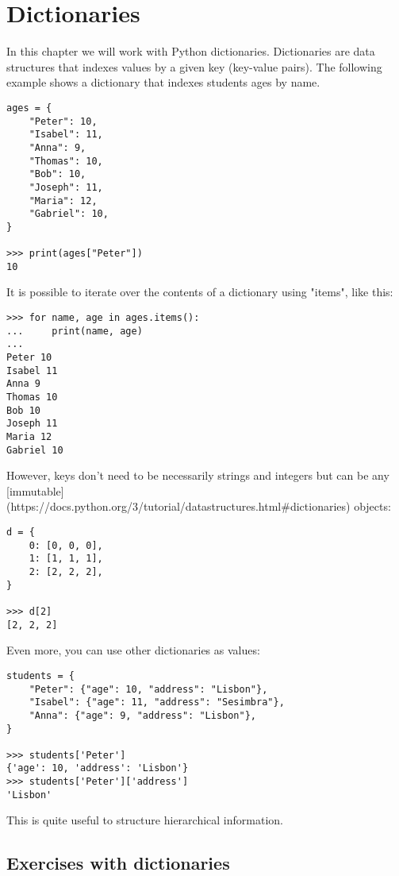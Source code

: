\chapter{Dictionaries}\label{dictionaries}

In this chapter we will work with Python dictionaries. Dictionaries are data structures that indexes values by a given key (key-value pairs). The following example shows a dictionary that indexes students ages by name.

\begin{lstlisting}
ages = {
    "Peter": 10,
    "Isabel": 11,
    "Anna": 9,
    "Thomas": 10,
    "Bob": 10,
    "Joseph": 11,
    "Maria": 12,
    "Gabriel": 10,
}

>>> print(ages["Peter"])
10
\end{lstlisting}

It is possible to iterate over the contents of a dictionary using "items", like this:

\begin{lstlisting}
>>> for name, age in ages.items():
...     print(name, age)
... 
Peter 10
Isabel 11
Anna 9
Thomas 10
Bob 10
Joseph 11
Maria 12
Gabriel 10
\end{lstlisting}

However, keys don't need to be necessarily strings and integers but can be any [immutable](https://docs.python.org/3/tutorial/datastructures.html#dictionaries) objects:

\begin{lstlisting}
d = {
    0: [0, 0, 0],
    1: [1, 1, 1],
    2: [2, 2, 2],
}

>>> d[2]
[2, 2, 2]
\end{lstlisting}

Even more, you can use other dictionaries as values:

\begin{lstlisting}
students = {
    "Peter": {"age": 10, "address": "Lisbon"},
    "Isabel": {"age": 11, "address": "Sesimbra"},
    "Anna": {"age": 9, "address": "Lisbon"},
}

>>> students['Peter']
{'age': 10, 'address': 'Lisbon'}
>>> students['Peter']['address']
'Lisbon'
\end{lstlisting}

This is quite useful to structure hierarchical information. 

\section{Exercises with dictionaries}

